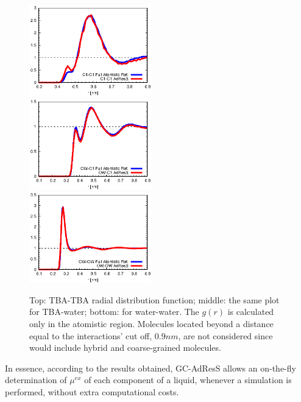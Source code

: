 \documentclass[a4paper,preprint,unsortedaddress]{revtex4-1}
\begin{document}
\begin{figure}
\center
\includegraphics[width=0.475\textwidth]{alcohol-alcohol.eps}\\
\includegraphics[width=0.475\textwidth]{alcohol-water.eps}\\
\includegraphics[width=0.475\textwidth]{water-water.eps}
\caption{Top: TBA-TBA radial distribution function; middle: the same plot for TBA-water; bottom: for water-water. The $g(r)$ is calculated only in the atomistic region.  Molecules located beyond a distance equal to the interactions' cut off, $0.9 nm$, are not considered since would include hybrid and coarse-grained molecules. \label{gr}}
\end{figure}
In essence, according to the results obtained, GC-AdResS allows an on-the-fly determination of $\mu^{ex}$ of each component of a liquid, whenever a simulation is performed, without extra computational costs.
\end{document}
